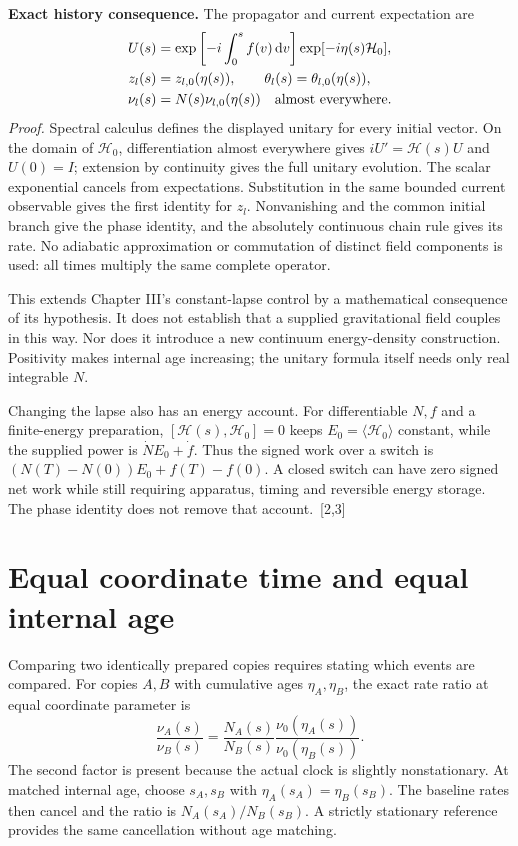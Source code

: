 \documentclass[10pt,twocolumn,letterpaper]{article}
\newcommand{\dd}{\mathrm{d}}
\begin{document}
\noindent\textbf{Exact history consequence.} The propagator and current expectation are
\[
\begin{aligned}
 U(s)&=\exp\left[-i\int_0^s f(v)\,\dd v\right]
              \exp[-i\eta(s)\mathcal H_0],\\
 z_l(s)&=z_{l,0}(\eta(s)),\qquad
 \theta_l(s)=\theta_{l,0}(\eta(s)),\\
 \nu_l(s)&=N(s)\nu_{l,0}(\eta(s))
 \quad\hbox{almost everywhere}.
\end{aligned}
\]
\textit{Proof.} Spectral calculus defines the displayed unitary for every initial vector. On the domain of $\mathcal H_0$, differentiation almost everywhere gives $iU'=\mathcal H(s)U$ and $U(0)=I$; extension by continuity gives the full unitary evolution. The scalar exponential cancels from expectations. Substitution in the same bounded current observable gives the first identity for $z_l$. Nonvanishing and the common initial branch give the phase identity, and the absolutely continuous chain rule gives its rate. No adiabatic approximation or commutation of distinct field components is used: all times multiply the same complete operator.

This extends Chapter III's constant-lapse control by a mathematical consequence of its hypothesis. It does not establish that a supplied gravitational field couples in this way. Nor does it introduce a new continuum energy-density construction. Positivity makes internal age increasing; the unitary formula itself needs only real integrable $N$.

Changing the lapse also has an energy account. For differentiable $N,f$ and a finite-energy preparation, $[\mathcal H(s),\mathcal H_0]=0$ keeps $E_0=\langle\mathcal H_0\rangle$ constant, while the supplied power is $\dot N E_0+\dot f$. Thus the signed work over a switch is $(N(T)-N(0))E_0+f(T)-f(0)$. A closed switch can have zero signed net work while still requiring apparatus, timing and reversible energy storage. The phase identity does not remove that account.~[2,3]


\section{Equal coordinate time and equal internal age}
Comparing two identically prepared copies requires stating which events are compared. For copies $A,B$ with cumulative ages $\eta_A,\eta_B$, the exact rate ratio at equal coordinate parameter is
\[
 \frac{\nu_A(s)}{\nu_B(s)}
 =\frac{N_A(s)}{N_B(s)}
  \frac{\nu_0(\eta_A(s))}{\nu_0(\eta_B(s))}.
\]
The second factor is present because the actual clock is slightly nonstationary. At matched internal age, choose $s_A,s_B$ with $\eta_A(s_A)=\eta_B(s_B)$. The baseline rates then cancel and the ratio is $N_A(s_A)/N_B(s_B)$. A strictly stationary reference provides the same cancellation without age matching.
\end{document}
